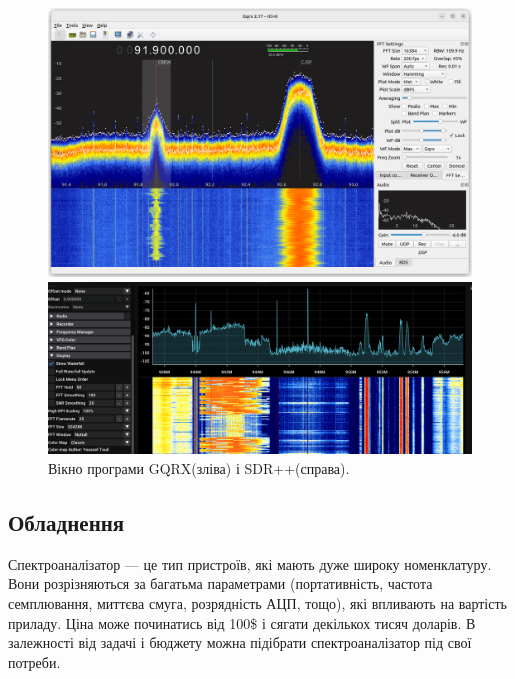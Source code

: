 \documentclass{article}
\begin{document}
\begin{figure}[H]
    \centering
       \begin{minipage}{0.35\textwidth}
        \centering
        \includegraphics[width=\textwidth]{images/gqrx.png}
    \end{minipage}
    \begin{minipage}{0.55\textwidth}
        \centering
        \includegraphics[width=\textwidth]{images/sdrpp.png}
    \end{minipage}
    \caption{Вікно програми GQRX(зліва) і SDR++(справа).}
\end{figure}

\subsection{Обладнення}

Спектроаналізатор --- це тип пристроїв, які мають дуже широку номенклатуру. Вони розрізняються за багатьма параметрами (портативність, частота семплювання, миттєва смуга, розрядність АЦП, тощо), які впливають на вартість приладу. Ціна може починатись від 100\$ і сягати декількох тисяч доларів. В залежності від задачі і бюджету можна підібрати спектроаналізатор під свої потреби.
\end{document}
